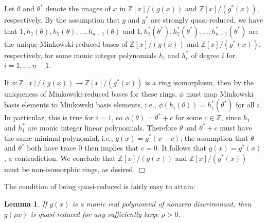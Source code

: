 \documentclass[11pt]{article}
\def\Z{{\mathbb Z}}
\def\Z{{\mathbb Z}}
\newtheorem{lemma}[theorem]{Lemma}
\newenvironment{proof}{\noindent {\bf Proof:}}{$\Box$ \vspace{2 ex}}
\begin{document}
\begin{proof}
Let $\theta$ and $\theta^*$ denote the images of $x$ in $\Z[x]/(g(x))$
and $\Z[x]/(g^*(x))$, respectively.  By the assumption that $g$ and
$g^\ast$ are strongly quasi-reduced, we have that
$1,h_1(\theta),h_2(\theta),\ldots,h_{n-1}(\theta)$ and
$1,h_1^*(\theta^*),h_2^*(\theta^*),\ldots,h^*_{n-1}(\theta^*)$ are
the unique Minkowski-reduced bases of $\Z[x]/(g(x))$ and
$\Z[x]/(g^*(x))$, respectively, for some monic integer polynomials
$h_i$ and $h_i^*$ of degree $i$ for $i=1,\ldots,n-1$.

If $\phi:\Z[x]/(g(x))\to\Z[x]/(g^*(x))$ is a ring isomorphism, then by
the uniqueness of Minkowski-reduced bases for these rings, $\phi$ must
map Minkowski basis elements to Minkowski basis elements, i.e.,
$\phi(h_i(\theta))=h_i^*(\theta^*)$ for all $i$.  In particular, this
is true for $i=1$, so $\phi(\theta)=\theta^*+c$ for some $c\in\Z$,
since $h_1$ and $h_1^*$ are monic integer linear polynomials.
Therefore $\theta$ and $\theta^*+c$ must have the same minimal
polynomial, i.e., $g(x)=g^*(x-c)$; the assumption that $\theta$ and
$\theta^*$ both have trace 0 then implies that $c=0$.  It follows that
$g(x)=g^*(x)$, a contradiction.  We conclude that $\Z[x]/(g(x))$ and
$\Z[x]/(g^*(x))$ must be non-isomorphic rings, as desired.
\end{proof}

The condition of being quasi-reduced
is fairly easy to attain:

\begin{lemma}\label{quasilemma}
If $g(x)$ is a monic real polynomial of nonzero discriminant, then
$g(\rho x)$ is quasi-reduced for any sufficiently large $\rho>0$.
\end{lemma}
\end{document}
